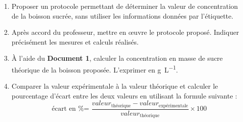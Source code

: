 \documentclass[a4paper,11pt,fleqn]{article}%
\begin{document}
\begin{enumerate}
\begin{enumerate}
	\end{enumerate}
	\item Proposer un protocole permettant de déterminer la valeur de concentration de la boisson sucrée, sans utiliser les informations données par l'étiquette.
	\item Après accord du professeur, mettre en \oe uvre  le protocole proposé. Indiquer précisément les mesures et calculs réalisés.
	\item À l'aide du \textbf{Document 1}, calculer la concentration en masse de sucre théorique de la boisson proposée. L'exprimer en \unit{\gram \per \liter}.
	\item Comparer la valeur expérimentale à la valeur théorique et calculer le pourcentage d'écart entre les deux valeurs en utilisant la formule suivante :
	$$\text{écart en \% = } \dfrac{valeur_{\text{théorique}}-valeur_{\text{expérimentale}}}{valeur_{\text{théorique}}} \times 100$$
\end{enumerate}
\end{document}
